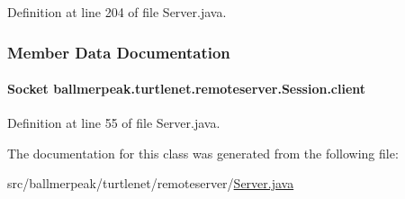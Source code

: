 Definition at line 204 of file Server.\-java.



\subsubsection{Member Data Documentation}
\hypertarget{classballmerpeak_1_1turtlenet_1_1remoteserver_1_1Session_a2506d1b24e158edf2fcfd2a31d57f43a}{
\paragraph[{client}]{\setlength{\rightskip}{0pt plus 5cm}Socket ballmerpeak.\-turtlenet.\-remoteserver.\-Session.\-client\hspace{0.3cm}{\ttfamily [private]}}}\label{classballmerpeak_1_1turtlenet_1_1remoteserver_1_1Session_a2506d1b24e158edf2fcfd2a31d57f43a}


Definition at line 55 of file Server.\-java.



The documentation for this class was generated from the following file\-:\begin{DoxyCompactItemize}
\item 
src/ballmerpeak/turtlenet/remoteserver/\hyperlink{Server_8java}{Server.\-java}\end{DoxyCompactItemize}
